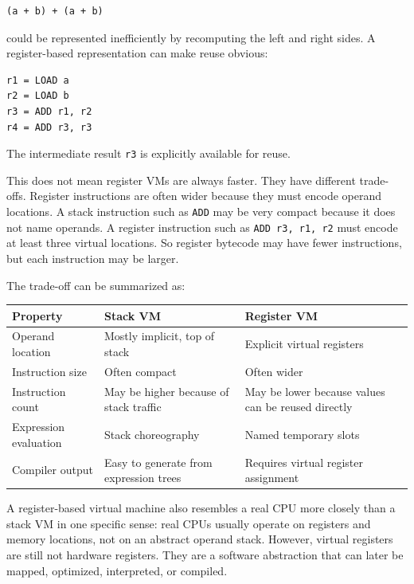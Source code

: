 \begin{verbatim}
(a + b) + (a + b)
\end{verbatim}

could be represented inefficiently by recomputing the left and right sides. A register-based representation can make reuse obvious:

\begin{verbatim}
r1 = LOAD a
r2 = LOAD b
r3 = ADD r1, r2
r4 = ADD r3, r3
\end{verbatim}

The intermediate result \texttt{r3} is explicitly available for reuse.

This does not mean register VMs are always faster. They have different trade-offs. Register instructions are often wider because they must encode operand locations. A stack instruction such as \texttt{ADD} may be very compact because it does not name operands. A register instruction such as \texttt{ADD r3, r1, r2} must encode at least three virtual locations. So register bytecode may have fewer instructions, but each instruction may be larger.

The trade-off can be summarized as:

\begin{center}
\begin{tabular}{|p{}|p{}|p{}|}
\hline
\textbf{Property} & \textbf{Stack VM} & \textbf{Register VM} \\
\hline
Operand location & Mostly implicit, top of stack & Explicit virtual registers \\
\hline
Instruction size & Often compact & Often wider \\
\hline
Instruction count & May be higher because of stack traffic & May be lower because values can be reused directly \\
\hline
Expression evaluation & Stack choreography & Named temporary slots \\
\hline
Compiler output & Easy to generate from expression trees & Requires virtual register assignment \\
\hline
\end{tabular}
\end{center}

A register-based virtual machine also resembles a real CPU more closely than a stack VM in one specific sense: real CPUs usually operate on registers and memory locations, not on an abstract operand stack. However, virtual registers are still not hardware registers. They are a software abstraction that can later be mapped, optimized, interpreted, or compiled.

